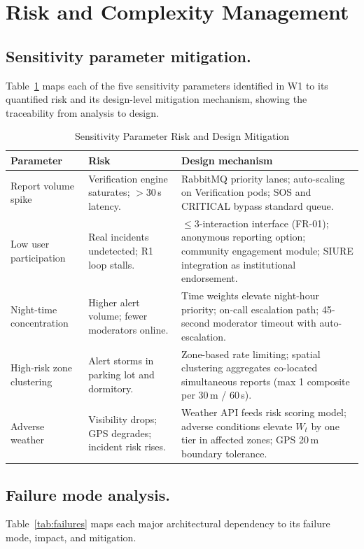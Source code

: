 \documentclass[12pt,a4paper]{article}
\begin{document}
\section{Risk and Complexity Management}
\label{sec:risk}

\subsection{Sensitivity parameter mitigation.}
Table~\ref{tab:risk} maps each of the five sensitivity parameters
identified in W1 to its quantified risk and its design-level mitigation
mechanism, showing the traceability from analysis to design.

\begin{table}[h]
\caption{Sensitivity Parameter Risk and Design Mitigation}
\label{tab:risk}
\centering
\begin{tabularx}{\textwidth}{lXX}
\toprule
\textbf{Parameter} & \textbf{Risk} & \textbf{Design mechanism} \\
\midrule
Report volume spike & Verification engine saturates; $>$30\,s latency. & RabbitMQ priority lanes; auto-scaling on Verification pods; SOS and CRITICAL bypass standard queue. \\
Low user participation & Real incidents undetected; R1 loop stalls. & $\leq$3-interaction interface (FR-01); anonymous reporting option; community engagement module; SIURE integration as institutional endorsement. \\
Night-time concentration & Higher alert volume; fewer moderators online. & Time weights elevate night-hour priority; on-call escalation path; 45-second moderator timeout with auto-escalation. \\
High-risk zone clustering & Alert storms in parking lot and dormitory. & Zone-based rate limiting; spatial clustering aggregates co-located simultaneous reports (max 1 composite per 30\,m / 60\,s). \\
Adverse weather & Visibility drops; GPS degrades; incident risk rises. & Weather API feeds risk scoring model; adverse conditions elevate $W_t$ by one tier in affected zones; GPS 20\,m boundary tolerance. \\
\bottomrule
\end{tabularx}
\end{table}

\subsection{Failure mode analysis.}
Table~\ref{tab:failures} maps each major architectural dependency to
its failure mode, impact, and mitigation.
\end{document}
